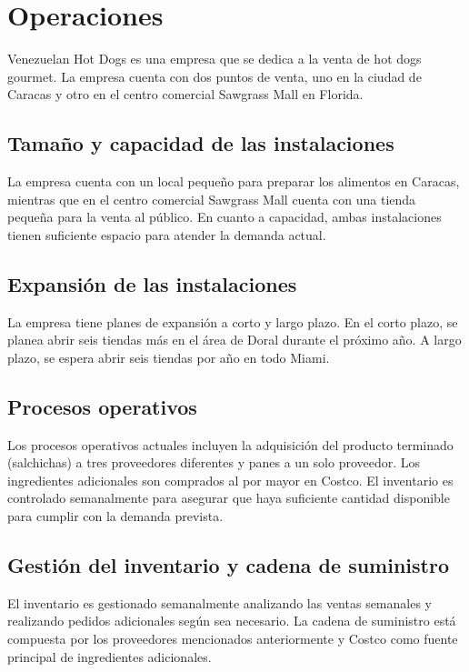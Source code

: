 \section{Operaciones}\label{sec:operaciones}

Venezuelan Hot Dogs es una empresa que se dedica a la venta de hot dogs gourmet. La empresa cuenta con dos puntos de venta, uno en la ciudad de Caracas y otro en el centro comercial Sawgrass Mall en Florida.

\subsection{Tamaño y capacidad de las instalaciones}

La empresa cuenta con un local pequeño para preparar los alimentos en Caracas, mientras que en el centro comercial Sawgrass Mall cuenta con una tienda pequeña para la venta al público. En cuanto a capacidad, ambas instalaciones tienen suficiente espacio para atender la demanda actual.

\subsection{Expansión de las instalaciones}

La empresa tiene planes de expansión a corto y largo plazo. En el corto plazo, se planea abrir seis tiendas más en el área de Doral durante el próximo año. A largo plazo, se espera abrir seis tiendas por año en todo Miami.

\subsection{Procesos operativos}

Los procesos operativos actuales incluyen la adquisición del producto terminado (salchichas) a tres proveedores diferentes y panes a un solo proveedor. Los ingredientes adicionales son comprados al por mayor en Costco. El inventario es controlado semanalmente para asegurar que haya suficiente cantidad disponible para cumplir con la demanda prevista.

\subsection{Gestión del inventario y cadena de suministro}

El inventario es gestionado semanalmente analizando las ventas semanales y realizando pedidos adicionales según sea necesario. La cadena de suministro está compuesta por los proveedores mencionados anteriormente y Costco como fuente principal de ingredientes adicionales.

